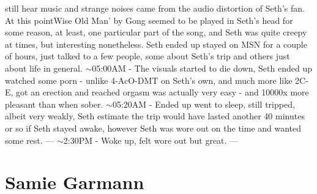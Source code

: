 \documentclass[12pt]{book}
\begin{document}
still hear music and strange noises came from the audio distortion of Seth's fan. At this pointWise Old Man' by Gong seemed to be played in Seth's head for some reason, at least, one particular part of the song, and Seth was quite creepy at times, but interesting nonetheless. Seth ended up stayed on MSN for a couple of hours, just talked to a few people, some about Seth's trip and others just about life in general. $\sim$05:00AM - The visuals started to die down, Seth ended up watched some porn - unlike 4-AcO-DMT on Seth's own, and much more like 2C-E, got an erection and reached orgasm was actually very easy - and 10000x more pleasant than when sober. $\sim$05:20AM - Ended up went to sleep, still tripped, albeit very weakly, Seth estimate the trip would have lasted another 40 minutes or so if Seth stayed awake, however Seth was wore out on the time and wanted some rest. --- $\sim$2:30PM - Woke up, felt wore out but great. ---



\chapter{Samie Garmann}
\end{document}

